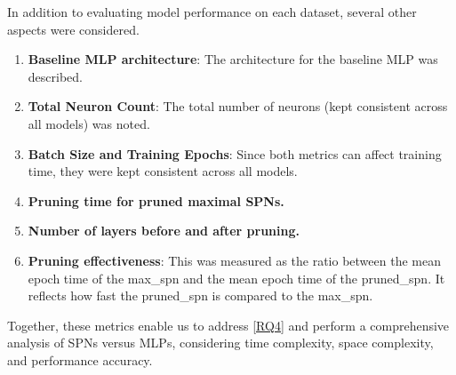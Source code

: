 In addition to evaluating model performance on each dataset, several other aspects were considered.

\begin{enumerate}
\item \textbf{Baseline MLP architecture}: The architecture for the baseline MLP was described.
\item \textbf{Total Neuron Count}: The total number of neurons (kept consistent across all models) was noted.
\item \textbf{Batch Size and Training Epochs}: Since both metrics can affect training time, they were kept consistent across all models.
\item \textbf{Pruning time for pruned maximal SPNs.}
\item \textbf{Number of layers before and after pruning.}
\item \textbf{Pruning effectiveness}: This was measured as the ratio between the mean epoch time of the max\_spn and the mean epoch time of the pruned\_spn. It reflects how fast the pruned\_spn is compared to the max\_spn.
\end{enumerate}

Together, these metrics enable us to address \ref{RQ4} and perform a comprehensive analysis of SPNs versus MLPs, considering time complexity, space complexity, and performance accuracy.